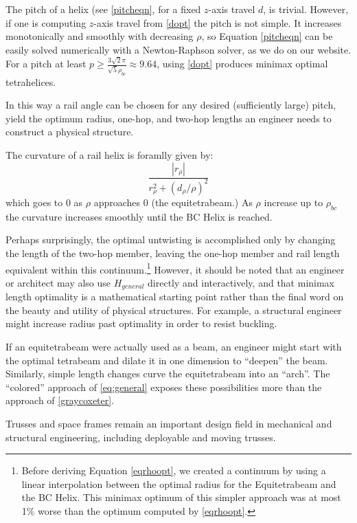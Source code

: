 \documentclass[review]{siamonline1116}
\begin{document}
 The pitch of a helix (see \cref{pitcheqn}, for a fixed $z$-axis travel $d$,
 is trivial.
However, if one is computing 
$z$-axis travel from \eqref{dopt} the pitch is not simple.
It increases monotonically and smoothly with decreasing $\rho$, so
Equation \eqref{pitcheqn} can be easily solved numerically with a Newton-Raphson
solver, as we do on our website.
For a pitch at least $ p \geq \frac{3  \sqrt{2}  \pi}{\sqrt{5}\rho_{bc}} \approx 9.64 $,
using \eqref{dopt} produces minimax optimal tetrahelices.

In this way a rail angle can be chosen for any desired (sufficiently large) pitch, yield
the optimum radius, one-hop, and two-hop lengths an engineer needs to
construct a physical structure.

The curvature of a rail helix is foramlly given by:
\begin{equation}
  \frac{|r_{\rho}|}{r_{\rho}^2 + (d_{\rho}/\rho)^2}
\end{equation}
which goes to $0$ as $\rho$ approaches $0$ (the equitetrabeam.)
As $\rho$ increase up to $\rho_{bc}$ the curvature increases smoothly until the BC Helix is reached.

Perhaps surprisingly, the optimal untwisting is accomplished only by
changing the length of the two-hop member, leaving the one-hop member
and rail length equivalent within this continuum.\footnote{Before
deriving Equation \eqref{eqrhoopt}, we created a continuum by
using a linear interpolation between the optimal radius for the
Equitetrabeam and the BC Helix. This minimax optimum of this simpler
approach was at most 1\% worse than the optimum computed by
\eqref{eqrhoopt}.}
 However, it should
be noted that an engineer or architect may also use $H_{general}$
directly and interactively, and that minimax length optimality is a
mathematical starting point rather than the final word on the beauty and utility of
physical structures. For example, a structural engineer might increase
radius past optimality in order to resist buckling.

If an equitetrabeam were actually
used as a beam, an engineer might start with the optimal tetrabeam and
dilate it in one dimension to ``deepen'' the beam. Similarly, simple
length changes curve the equitetrabeam into an ``arch''.
The ``colored'' approach of \cref{eq:general} exposes these possibilities
more than the approach of \cref{graycoxeter}.

Trusses and space frames remain an important design field in
mechanical and structural engineering\cite{mikulas1985sequentially},
including deployable and moving trusses\cite{claypool2012readily}.
\end{document}
